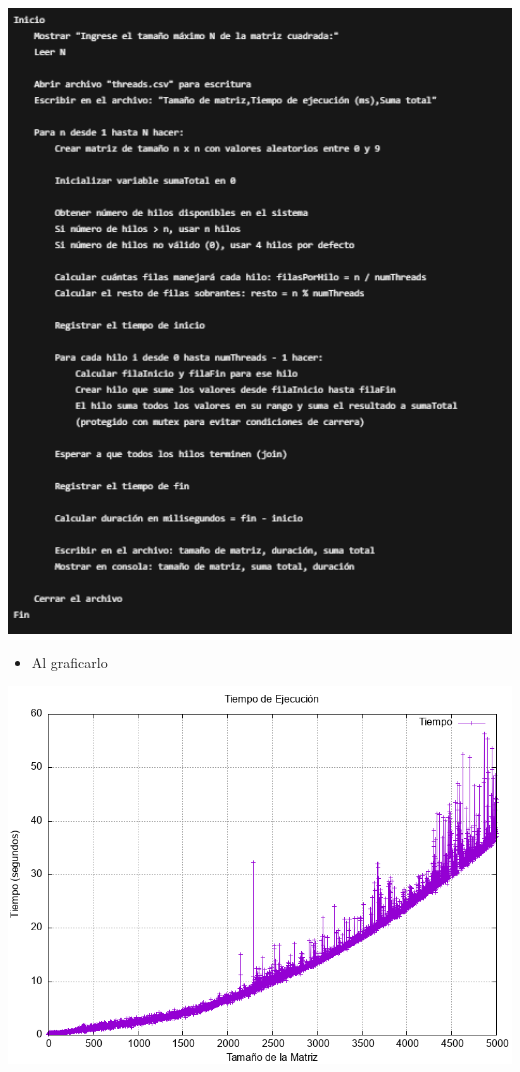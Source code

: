 \documentclass{article}
\begin{document}
        \includegraphics[width=1\textwidth]{img/pseudocodigo_2.png}
        
	\begin{itemize}	
		\item Al graficarlo
	\end{itemize}


        \includegraphics[width=1\textwidth]{img/grafica_2.png}
\end{document}
